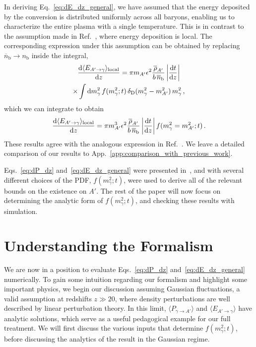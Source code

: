 \documentclass[prd,aps,10pt,nofootinbib,twocolumn,superscriptaddress,preprintnumbers,balancelastpage,longbibliography]{revtex4-1}
\begin{document}
In deriving Eq.~\eqref{eq:dE_dz_general}, we have assumed that the energy deposited by the conversion is distributed uniformly across all baryons, enabling us to characterize the entire plasma with a single temperature. 
This is in contrast to the assumption made in Ref.~\cite{Witte:2020rvb}, where energy deposition is local. 
The corresponding expression under this assumption can be obtained by replacing $\overline{n}_\text{b} \to n_\text{b}$ inside the integral,
%
\begin{multline}
    \frac{\mathrm{d} \langle E_{A' \to \gamma} \rangle_\text{local}}{\mathrm{d} z} = \pi m_{A^\prime} \epsilon^2 \frac{\overline{\rho}_{A'}}{b\,\overline{n}_\text{b}} \left| \frac{\mathrm{d} t}{\mathrm{d} z} \right| \\
    \times \int \mathrm{d} m_\gamma^2 \, f(m_\gamma^2;t) \, \delta_\text{D}(m_\gamma^2 - m_{A^\prime}^2)\, m_\gamma^2 \,,
    \label{eq:dE_dz_local}
\end{multline}
%
which we can integrate to obtain
%
\begin{alignat}{1}
    \frac{\mathrm{d} \langle E_{A' \to \gamma} \rangle_\text{local}}{\mathrm{d} z} = \pi m_{A'}^3 \epsilon^2 \frac{\overline{\rho}_{A'}}{b\,\overline{n}_\text{b}} \left| \frac{\mathrm{d} t}{\mathrm{d} z} \right| f(m_\gamma^2 = m_{A^\prime}^2; t) \,.
    \label{eq:dE_dz_local_simple}
\end{alignat}
%
These results agree with the analogous expression in Ref.~\cite{Witte:2020rvb}. We leave a detailed comparison of our results to App.~\ref{app:comparison_with_previous_work}.

Eqs.~\eqref{eq:dP_dz} and~\eqref{eq:dE_dz_general} were presented in~, and with several different choices of the PDF, $f(m_\gamma^2;t)$, were used to derive all of the relevant bounds on the existence on $A'$. 
The rest of the paper will now focus on determining the analytic form of $f(m_\gamma^2;t)$, and checking these results with simulation. 

\section{Understanding the Formalism}
\label{sec:linear_regime}

We are now in a position to evaluate Eqs.~\eqref{eq:dP_dz} and~\eqref{eq:dE_dz_general} numerically. 
To gain some intuition regarding our formalism and highlight some important physics, we begin our discussion assuming Gaussian fluctuations, a valid assumption at redshifts $z \gg 20$, where density perturbations are well described by linear perturbation theory. 
In this limit, $\langle P_{\gamma \to A'} \rangle$ and $\langle E_{A' \to \gamma} \rangle$ have analytic solutions, which serve as a useful pedagogical example for our full treatment.
We will first discuss the various inputs that determine $f(m_\gamma^2;t)$, before discussing the analytics of the result in the Gaussian regime. 
\end{document}
